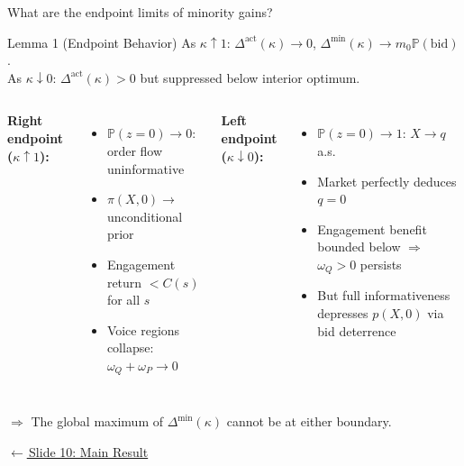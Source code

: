 \documentclass[aspectratio=169,10pt]{beamer}
\newcommand{\PP}{\mathbb{P}}
\newcommand{\1}{\mathbf{1}}
\newcommand{\returnlink}[2]{%
  \par\vspace{0.2em}\hfill{\scriptsize\hyperlink{#1}{\textcolor{brightblue}{$\leftarrow$\,#2}}}%
}
\begin{document}
\begin{frame}{What are the endpoint limits of minority gains?}
\hypertarget{backup:endpoint_behavior}{}
\small
\begin{block}{Lemma 1 (Endpoint Behavior)}
\vspace{-0.2em}
{\small As $\kappa\uparrow 1$: $\Delta^{\text{act}}(\kappa)\to 0$, $\Delta^{\min}(\kappa)\to m_0\PP(\text{bid})$.\\
As $\kappa\downarrow 0$: $\Delta^{\text{act}}(\kappa) > 0$ but suppressed below interior optimum.}
\vspace{-0.2em}
\end{block}

\begin{columns}[T,onlytextwidth]
\textbf{Right endpoint ($\kappa \uparrow 1$):}
\begin{itemize}\itemsep0.1em
  \item $\PP(z{=}0) \to 0$: order flow uninformative
  \item $\pi(X,0) \to$ unconditional prior
  \item Engagement return $< C(s)$ for all $s$
  \item Voice regions collapse: $\omega_Q + \omega_P \to 0$
\end{itemize}

\textbf{Left endpoint ($\kappa \downarrow 0$):}
\begin{itemize}\itemsep0.1em
  \item $\PP(z{=}0) \to 1$: $X \to q$ a.s.
  \item Market perfectly deduces $q = 0$
  \item Engagement benefit bounded below $\Rightarrow$ $\omega_Q > 0$ persists
  \item But full informativeness depresses $p(X,0)$ via bid deterrence
\end{itemize}
\end{columns}

\vspace{0.2em}
{\footnotesize $\Rightarrow$ The global maximum of $\Delta^{\min}(\kappa)$ cannot be at either boundary.}

\returnlink{main:result}{Slide 10: Main Result}
\end{frame}
\end{document}
